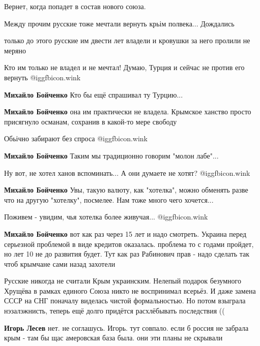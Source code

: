 \begin{itemize}
Вернет, когда попадет в состав нового союза.

Между прочим русские тоже мечтали вернуть крьім полвека... Дождались

\begin{itemize} %
только до этого русские им двести лет владели и кровушки за него пролили не меряно

Кто им только не владел и не мечтал! Думаю, Турция и сейчас не против его вернуть @igg{fbicon.wink} 

\textbf{Михайло Бойченко} Кто бы ещё спрашивал ту Турцию...

\textbf{Михайло Бойченко} она им практически не владела. Крымское ханство просто присягнуло османам, сохранив в какой-то мере свободу

Обьічно забирают без спроса @igg{fbicon.wink} 

\textbf{Михайло Бойченко} Таким мы традиционно говорим "молон лабе"...

Ну вот, не хотел ханов вспоминать... А они думаете не хотят? @igg{fbicon.wink} 

\textbf{Михайло Бойченко} Увы, такую валюту, как "хотелка", можно обменять разве что на другую "хотелку", посмелее. Нам тоже много чего хочется...

Поживем - увидим, чья хотелка более живучая... @igg{fbicon.wink} 

\textbf{Михайло Бойченко} вот как раз через 15 лет и надо смотреть. Украина перед серьезной проблемой в виде кредитов оказалась. проблема то с годами пройдет, но лет 10 не до развития будет. Тут как раз Рабинович прав - надо сделать так чтоб крымчане сами назад захотели


Русские никогда не считали Крым украинским. Нелепый подарок безумного Хрущёва в
рамках единого Союза никто не воспринимал всерьёз. И даже замена СССР на СНГ
поначалу виделась чистой формальностью. Но потом взыграла нэзалэжнисть, теперь
ещё долго придётся расхлёбывать последствия ((

\textbf{Игорь Лесев} нет. не соглашусь. Игорь. тут совпало. если б россия не забрала крым - там бы щас амеровская база была. они эти планы не скрывали


\end{itemize}
\end{itemize}
